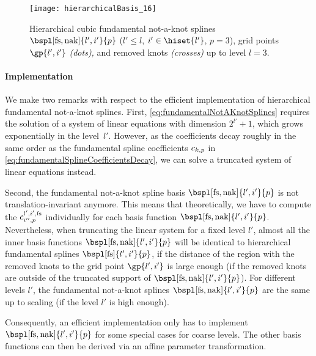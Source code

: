 \begin{SCfigure}
  \texttt{[image: hierarchicalBasis\_16]}%
  \caption[%
    Hierarchical fundamental not-a-knot splines%
  ]{%
    Hierarchical cubic fundamental not-a-knot splines
    $\bspl[\fs,\nak]{l',i'}{p}$
    ($l' \le l$, $i' \in \hiset{l'}$, $p = 3$),
    grid points $\gp{l',i'}$ \emph{(dots),} and
    removed knots \emph{(crosses)} up to level $l = 3$.%
  }%
  \label{fig:hierarchicalFundamentalNotAKnotSpline}%
\end{SCfigure}

\paragraph{Implementation}

We make two remarks with respect to the efficient implementation
of hierarchical fundamental not-a-knot splines.
First,
\cref{eq:fundamentalNotAKnotSplines} requires the solution of a system
of linear equations with dimension $2^{l'} + 1$,
which grows exponentially in the level~$l'$.
However, as the coefficients decay roughly in the same order
as the fundamental spline coefficients $\fundsplcoeff{k}{p}$ in
\cref{eq:fundamentalSplineCoefficientsDecay},
we can solve a truncated system of linear equations instead.

Second, the fundamental not-a-knot spline basis
$\bspl[\fs,\nak]{l',i'}{p}$ is not translation-invariant anymore.
This means that theoretically, we have to compute the
$\fundsplcoeff[l',i',\fs]{i''}{p}$ individually for each basis function
$\bspl[\fs,\nak]{l',i'}{p}$.
Nevertheless, when truncating the linear system for a fixed level $l'$,
almost all the inner basis functions $\bspl[\fs,\nak]{l',i'}{p}$
will be identical to hierarchical fundamental splines
$\bspl[\fs]{l',i'}{p}$, if the distance of the region with the removed knots
to the grid point $\gp{l',i'}$ is large enough
(if the removed knots are outside of the truncated support of
$\bspl[\fs,\nak]{l',i'}{p}$).
For different levels $l'$, the fundamental not-a-knot splines
$\bspl[\fs,\nak]{l',i'}{p}$ are the same up to scaling
(if the level $l'$ is high enough).

Consequently, an efficient implementation only has to implement
$\bspl[\fs,\nak]{l',i'}{p}$ for some special cases for coarse levels.
The other basis functions can then be derived via an affine
parameter transformation.
